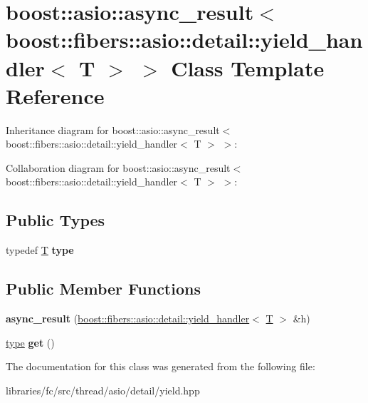 \hypertarget{classboost_1_1asio_1_1async__result_3_01boost_1_1fibers_1_1asio_1_1detail_1_1yield__handler_3_01_t_01_4_01_4}{}\section{boost\+:\+:asio\+:\+:async\+\_\+result$<$ boost\+:\+:fibers\+:\+:asio\+:\+:detail\+:\+:yield\+\_\+handler$<$ T $>$ $>$ Class Template Reference}
\label{classboost_1_1asio_1_1async__result_3_01boost_1_1fibers_1_1asio_1_1detail_1_1yield__handler_3_01_t_01_4_01_4}


Inheritance diagram for boost\+:\+:asio\+:\+:async\+\_\+result$<$ boost\+:\+:fibers\+:\+:asio\+:\+:detail\+:\+:yield\+\_\+handler$<$ T $>$ $>$\+:


Collaboration diagram for boost\+:\+:asio\+:\+:async\+\_\+result$<$ boost\+:\+:fibers\+:\+:asio\+:\+:detail\+:\+:yield\+\_\+handler$<$ T $>$ $>$\+:
\subsection*{Public Types}
\begin{DoxyCompactItemize}
\item 
\mbox{\label{classboost_1_1asio_1_1async__result_3_01boost_1_1fibers_1_1asio_1_1detail_1_1yield__handler_3_01_t_01_4_01_4_ae9ed262e67ab4f9e8837ee9a96d6209d}} 
typedef \mbox{\hyperlink{struct_t}{T}} {\bfseries type}
\end{DoxyCompactItemize}
\subsection*{Public Member Functions}
\begin{DoxyCompactItemize}
\item 
\mbox{\label{classboost_1_1asio_1_1async__result_3_01boost_1_1fibers_1_1asio_1_1detail_1_1yield__handler_3_01_t_01_4_01_4_a8eb8ce036c4c3ee71cee3cc20f16688b}} 
{\bfseries async\+\_\+result} (\mbox{\hyperlink{classboost_1_1fibers_1_1asio_1_1detail_1_1yield__handler}{boost\+::fibers\+::asio\+::detail\+::yield\+\_\+handler}}$<$ \mbox{\hyperlink{struct_t}{T}} $>$ \&h)
\item 
\mbox{\label{classboost_1_1asio_1_1async__result_3_01boost_1_1fibers_1_1asio_1_1detail_1_1yield__handler_3_01_t_01_4_01_4_a4a816f3c11cd82062df9f2cc3a3e747b}} 
\mbox{\hyperlink{struct_t}{type}} {\bfseries get} ()
\end{DoxyCompactItemize}


The documentation for this class was generated from the following file\+:\begin{DoxyCompactItemize}
\item 
libraries/fc/src/thread/asio/detail/yield.\+hpp\end{DoxyCompactItemize}
